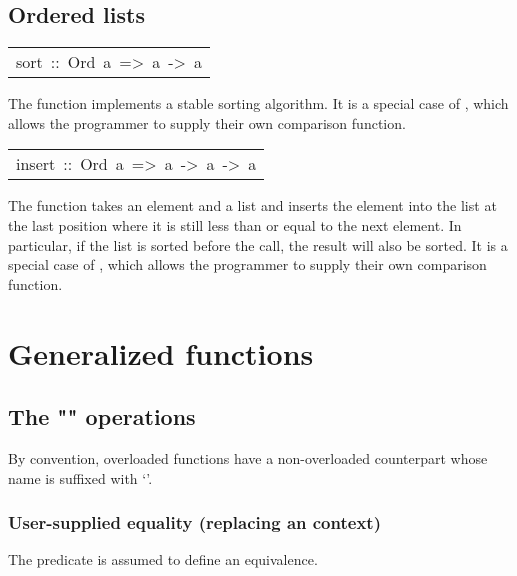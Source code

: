 \subsection{Ordered lists
}
\begin{haddockdesc}
\item[\begin{tabular}{@{}l}
sort\ ::\ Ord\ a\ =>\ {\char 91}a{\char 93}\ ->\ {\char 91}a{\char 93}
\end{tabular}]\haddockbegindoc
The  function implements a stable sorting algorithm.
 It is a special case of , which allows the programmer to supply
 their own comparison function.
\par

\end{haddockdesc}
\begin{haddockdesc}
\item[\begin{tabular}{@{}l}
insert\ ::\ Ord\ a\ =>\ a\ ->\ {\char 91}a{\char 93}\ ->\ {\char 91}a{\char 93}
\end{tabular}]\haddockbegindoc
The  function takes an element and a list and inserts the
 element into the list at the last position where it is still less
 than or equal to the next element.  In particular, if the list
 is sorted before the call, the result will also be sorted.
 It is a special case of , which allows the programmer to
 supply their own comparison function.
\par

\end{haddockdesc}
\section{Generalized functions
}
\subsection{The "" operations
}
By convention, overloaded functions have a non-overloaded
 counterpart whose name is suffixed with `'.
\par

\subsubsection{User-supplied equality (replacing an  context)
}
The predicate is assumed to define an equivalence.
\par

